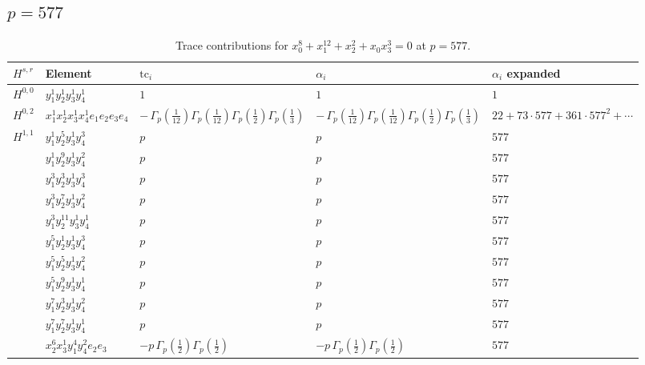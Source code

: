 \documentclass[11pt]{article}
\begin{document}
\subsection*{$p = 577$}

\begin{table}[ht]
\centering
\caption{Trace contributions for $x_0^{8} + x_1^{12} + x_2^{2} + x_0 x_3^{3} = 0$ at $p=577$.}\label{tab:deformed-63}
\renewcommand{\arraystretch}{1.1}
{\scriptsize
\begin{tabular}{@{}lllll@{}}
\toprule
$H^{s,r}$ & Element & $\mathrm{tc}_i$ & $\alpha_i$ & $\alpha_i$ expanded \\
\midrule
$H^{0,0}$ & $y_{1}^{1} y_{2}^{1} y_{3}^{1} y_{4}^{1}$ & $1$ & $1$ & $1$ \\
\midrule
$H^{0,2}$ & $x_{1}^{1} x_{2}^{1} x_{3}^{1} x_{4}^{1}  e_{1} e_{2} e_{3} e_{4}$ & $- \, \Gamma_p \left( \frac{1}{12} \right) \Gamma_p \left( \frac{1}{12} \right) \Gamma_p \left( \frac{1}{2} \right) \Gamma_p \left( \frac{1}{3} \right)$ & $- \, \Gamma_p \left( \frac{1}{12} \right) \Gamma_p \left( \frac{1}{12} \right) \Gamma_p \left( \frac{1}{2} \right) \Gamma_p \left( \frac{1}{3} \right)$ & $22{+}73{\cdot}577{+}361{\cdot}577^{2}{+}\cdots$ \\
\midrule
$H^{1,1}$ & $y_{1}^{1} y_{2}^{5} y_{3}^{1} y_{4}^{3}$ & $p \,$ & $p \,$ & $577$ \\
 & $y_{1}^{1} y_{2}^{9} y_{3}^{1} y_{4}^{2}$ & $p \,$ & $p \,$ & $577$ \\
 & $y_{1}^{3} y_{2}^{3} y_{3}^{1} y_{4}^{3}$ & $p \,$ & $p \,$ & $577$ \\
 & $y_{1}^{3} y_{2}^{7} y_{3}^{1} y_{4}^{2}$ & $p \,$ & $p \,$ & $577$ \\
 & $y_{1}^{3} y_{2}^{11} y_{3}^{1} y_{4}^{1}$ & $p \,$ & $p \,$ & $577$ \\
 & $y_{1}^{5} y_{2}^{1} y_{3}^{1} y_{4}^{3}$ & $p \,$ & $p \,$ & $577$ \\
 & $y_{1}^{5} y_{2}^{5} y_{3}^{1} y_{4}^{2}$ & $p \,$ & $p \,$ & $577$ \\
 & $y_{1}^{5} y_{2}^{9} y_{3}^{1} y_{4}^{1}$ & $p \,$ & $p \,$ & $577$ \\
 & $y_{1}^{7} y_{2}^{3} y_{3}^{1} y_{4}^{2}$ & $p \,$ & $p \,$ & $577$ \\
 & $y_{1}^{7} y_{2}^{7} y_{3}^{1} y_{4}^{1}$ & $p \,$ & $p \,$ & $577$ \\
 & $x_{2}^{6} x_{3}^{1} y_{1}^{4} y_{4}^{2} e_{2} e_{3}$ & $- p \, \Gamma_p \left( \frac{1}{2} \right) \Gamma_p \left( \frac{1}{2} \right)$ & $- p \, \Gamma_p \left( \frac{1}{2} \right) \Gamma_p \left( \frac{1}{2} \right)$ & $577$ \\

\end{tabular}}
\end{table}
\end{document}
